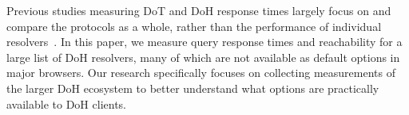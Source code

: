 Previous studies measuring DoT and DoH response times largely
focus on and compare the protocols as a whole, rather than the performance of
individual resolvers~\cite{lu2019end-to-end}.  
In this paper, we measure query response times and reachability for a large
list of DoH resolvers, many of which are not available as default options in
major browsers. 
Our research specifically
focuses on collecting measurements of the larger DoH ecosystem to better
understand what options are practically available to DoH clients.

